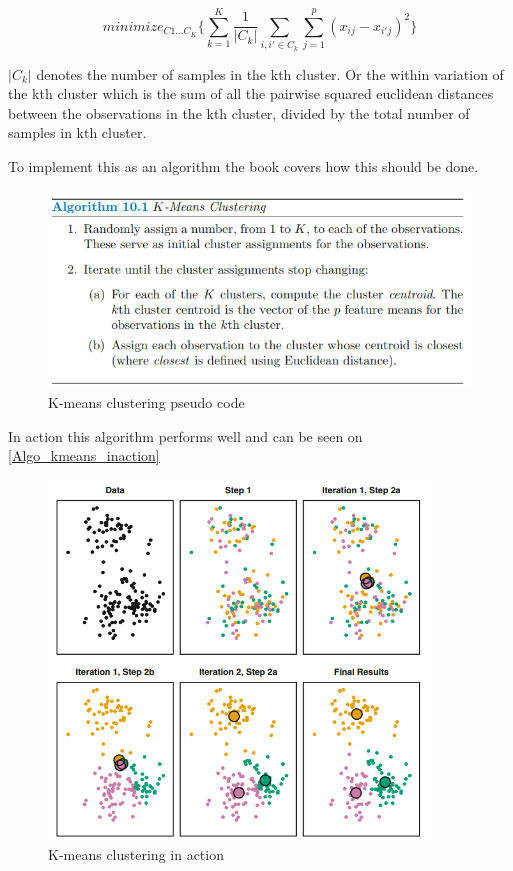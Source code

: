\begin{equation} \label{transformed_linear_regression_eq}
minimize_{C1...C_{K}}\{\sum_{k=1}^{K}\dfrac{1}{\lvert C_{k} \rvert} \sum_{i,i'\in C_{k}}^{} \sum_{j=1}^{p}(x_{ij}-x_{i'j})^{2} \}
\end{equation}

$\lvert C_{k}\rvert$ denotes the number of samples in the kth cluster. Or the within variation of the kth cluster which is the sum of all the pairwise squared euclidean distances between the observations in the kth cluster, divided by the total number of samples in kth cluster.

To implement this as an algorithm the book covers how this should be done. 

\begin{figure}[H]
	\centering
	\includegraphics[width=12cm]{Img/Algo_kmeans.PNG}
	\caption{K-means clustering pseudo code}
	\label{fig:k-Algo_kmeans.PNG}
\end{figure} 

In action this algorithm performs well and can be seen on \cref{Algo_kmeans_inaction}

\begin{figure}[H]
	\centering
	\includegraphics[width=10cm]{Img/Kmean_algo_example.PNG}
	\caption{K-means clustering in action}
	\label{fig:k-Algo_kmeans_inaction.PNG}
\end{figure} 


